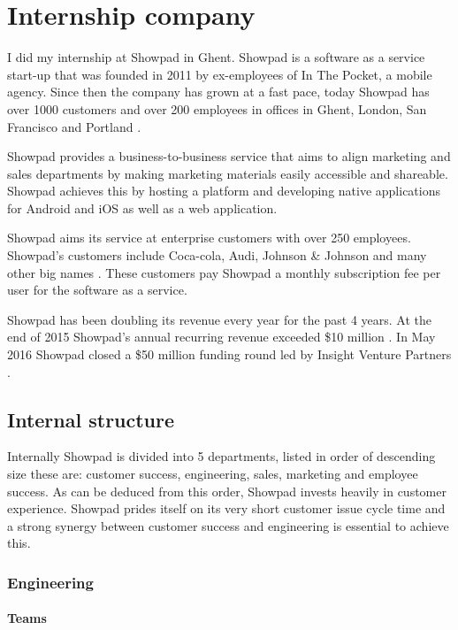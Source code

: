 
\chapter{Internship company} %
\label{sec:voorstelling}

I did my internship at Showpad in Ghent. Showpad is a software as a service start-up that was founded in 2011 by ex-employees of In The Pocket, a mobile agency. Since then the company has grown at a fast pace, today Showpad has over 1000 customers and over 200 employees in offices in Ghent, London, San Francisco and Portland \cite{showpad-grow}.

Showpad provides a business-to-business service that aims to align marketing and sales departments by making marketing materials easily accessible and shareable. Showpad achieves this by hosting a platform and developing native applications for Android and iOS as well as a web application.

Showpad aims its service at enterprise customers with over 250 employees. Showpad's customers include Coca-cola, Audi, Johnson \& Johnson and many other big names \cite{showpad}. These customers pay Showpad a monthly subscription fee per user for the software as a service.

Showpad has been doubling its revenue every year for the past 4 years. At the end of 2015 Showpad's annual recurring revenue exceeded \$10 million \cite{showpad-arr}. In May 2016 Showpad closed a \$50 million funding round led by Insight Venture Partners \cite{showpad-grow}.

\section{Internal structure}

Internally Showpad is divided into 5 departments, listed in order of descending size these are: customer success, engineering, sales, marketing and employee success. As can be deduced from this order, Showpad invests heavily in customer experience. Showpad prides itself on its very short customer issue cycle time and a strong synergy between customer success and engineering is essential to achieve this.

\subsection{Engineering}

\subsubsection{Teams}

